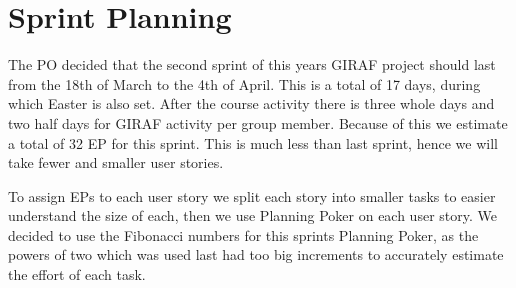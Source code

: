 \chapter{Sprint Planning}
The PO decided that the second sprint of this years GIRAF project should last from the 18th of March to the 4th of April.
This is a total of 17 days, during which Easter is also set.
After the course activity there is three whole days and two half days for GIRAF activity per group member.
Because of this we estimate a total of 32 EP for this sprint.
This is much less than last sprint, hence  we will take fewer and smaller user stories.

To assign EPs to each user story we split each story into smaller tasks to easier understand the size of each, then we use Planning Poker on each user story.
We decided to use the Fibonacci numbers for this sprints Planning Poker, as the powers of two which was used last had too big increments to accurately estimate the effort of each task.
